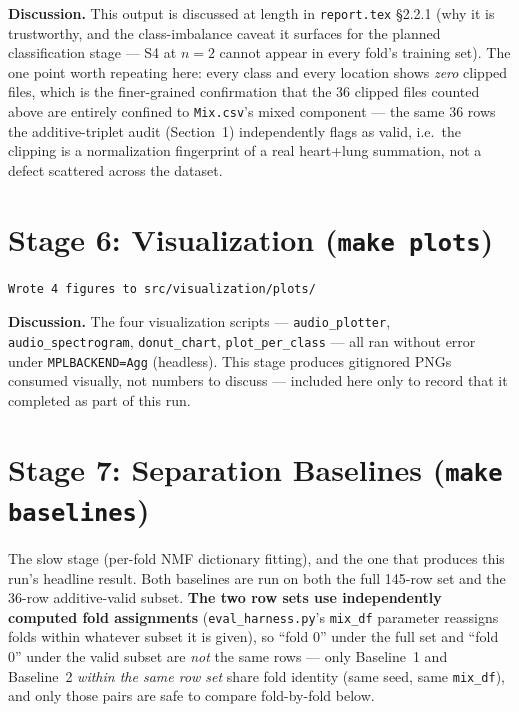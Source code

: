 \documentclass[11pt]{article}
\begin{document}
\textbf{Discussion.} This output is discussed at length in
\texttt{report.tex} \S2.2.1 (why it is trustworthy, and the class-imbalance
caveat it surfaces for the planned classification stage --- S4 at $n{=}2$
cannot appear in every fold's training set). The one point worth repeating
here: every class and every location shows \emph{zero} clipped files,
which is the finer-grained confirmation that the 36 clipped files counted
above are entirely confined to \texttt{Mix.csv}'s mixed component --- the
same 36 rows the additive-triplet audit (Section~1) independently flags as
valid, i.e.\ the clipping is a normalization fingerprint of a real
heart+lung summation, not a defect scattered across the dataset.

\section{Stage 6: Visualization (\texttt{make plots})}

\begin{verbatim}
Wrote 4 figures to src/visualization/plots/
\end{verbatim}

{\sloppy
\textbf{Discussion.} The four visualization scripts ---
\texttt{audio\_plotter}, \texttt{audio\_spectrogram}, \texttt{donut\_chart},
\texttt{plot\_per\_class} --- all ran without error under
\texttt{MPLBACKEND=Agg} (headless). This stage produces gitignored PNGs
consumed visually, not numbers to discuss --- included here only to record
that it completed as part of this run.
\par}

\section{Stage 7: Separation Baselines (\texttt{make baselines})}
\label{sec:baselines}

The slow stage (per-fold NMF dictionary fitting), and the one that produces
this run's headline result. Both baselines are run on both the full 145-row
set and the 36-row additive-valid subset. \textbf{The two row sets use
independently computed fold assignments} (\texttt{eval\_harness.py}'s
\texttt{mix\_df} parameter reassigns folds within whatever subset it is
given), so ``fold 0'' under the full set and ``fold 0'' under the valid
subset are \emph{not} the same rows --- only Baseline~1 and Baseline~2
\emph{within the same row set} share fold identity (same seed, same
\texttt{mix\_df}), and only those pairs are safe to compare fold-by-fold
below.
\end{document}
